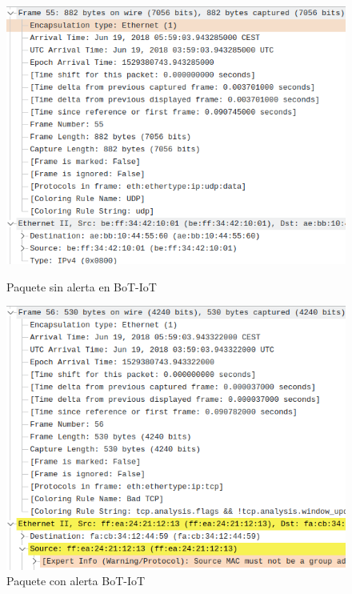\begin{figure}[H]
      \includegraphics[width=\linewidth]{media/botiot_pcap_ethii_packet.png}
      \captionsetup{justification=centering}
      \caption{Paquete sin alerta en BoT-IoT}\label{fig:botiot_pcap_ethii_packet}
    \endminipage\hfill
      \includegraphics[width=\linewidth]{media/botiot_pcap_ethii_packet_warn.png}
      \captionsetup{justification=centering}
      \caption{Paquete con alerta BoT-IoT}\label{fig:botiot_pcap_ethii_packet_warn}
    \endminipage\hfill
\end{figure}
